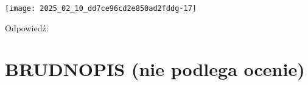 \documentclass[10pt]{article}
\begin{document}
\begin{center}
\texttt{[image: 2025\_02\_10\_dd7ce96cd2e850ad2fddg-17]}
\end{center}

Odpowiedź:

\section*{BRUDNOPIS (nie podlega ocenie)}
\end{document}
